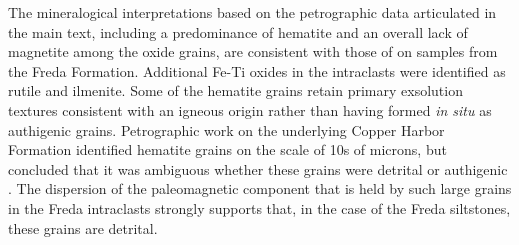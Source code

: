 \documentclass[11pt,letterpaper]{article}
\begin{document}
The mineralogical interpretations based on the petrographic data articulated in the main text, including a predominance of hematite and an overall lack of magnetite among the oxide grains, are consistent with those of \cite{Vincenz1968b} on samples from the Freda Formation. Additional Fe-Ti oxides in the intraclasts were identified as rutile and ilmenite. Some of the hematite grains retain primary exsolution textures consistent with an igneous origin rather than having formed \textit{in situ} as authigenic grains. Petrographic work on the underlying Copper Harbor Formation identified hematite grains on the scale of 10s of microns, but concluded that it was ambiguous whether these grains were detrital or authigenic \citep{Elmore1982a}. The dispersion of the paleomagnetic component that is held by such large grains in the Freda intraclasts strongly supports that, in the case of the Freda siltstones, these grains are detrital.



\end{document}
